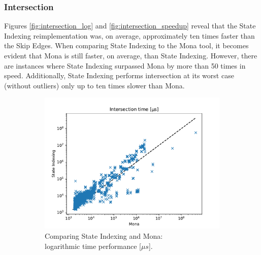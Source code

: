 \documentclass[pdflatex,sn-mathphys-num]{sn-jnl}%
\theoremstyle{thmstyleone}%
\theoremstyle{thmstyletwo}%
\theoremstyle{thmstylethree}%
\begin{document}
        \subsubsection*{Intersection}
            Figures \ref{fig:intersection_log} and \ref{fig:intersection_speedup} reveal that the State Indexing reimplementation was, on average, approximately ten times faster than the Skip Edges. When comparing State Indexing to the Mona tool, it becomes evident that Mona is still faster, on average, than State Indexing. However, there are instances where State Indexing surpassed Mona by more than 50 times in speed. Additionally, State Indexing performs intersection at its worst case (without outliers) only up to ten times slower than Mona.
            \vspace*{-1em}
            \begin{figure}[h!]
                \centering
                \captionsetup[subfigure]{justification=centering}
                \begin{subfigure}{0.49\textwidth}
                    \includegraphics[width=\textwidth]{Figures/intersection-mona.pdf}
                    \caption*{Comparing State Indexing and Mona:\\ logarithmic time performance [$\mu s$].}
                \end{subfigure}
                \begin{subfigure}{0.49\textwidth}

\end{subfigure}
\end{figure}
\end{document}
